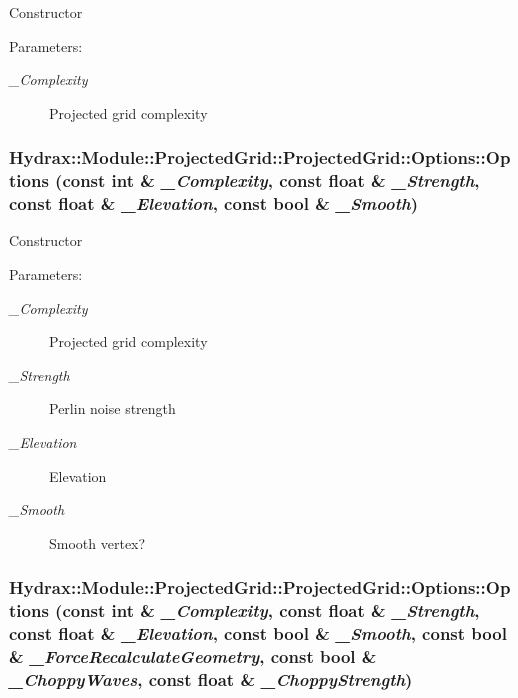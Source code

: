 Constructor \begin{Desc}
\item[Parameters:]
\begin{description}
\item[{\em \_\-Complexity}]Projected grid complexity \end{description}
\end{Desc}
\hypertarget{struct_hydrax_1_1_module_1_1_projected_grid_1_1_options_3c7e63596f51adb9435fcd88e9bde2b7}{
\subsubsection[{Options}]{\setlength{\rightskip}{0pt plus 5cm}Hydrax::Module::ProjectedGrid::ProjectedGrid::Options::Options (const int \& {\em \_\-Complexity}, \/  const float \& {\em \_\-Strength}, \/  const float \& {\em \_\-Elevation}, \/  const bool \& {\em \_\-Smooth})}}
\label{struct_hydrax_1_1_module_1_1_projected_grid_1_1_options_3c7e63596f51adb9435fcd88e9bde2b7}


Constructor \begin{Desc}
\item[Parameters:]
\begin{description}
\item[{\em \_\-Complexity}]Projected grid complexity \item[{\em \_\-Strength}]Perlin noise strength \item[{\em \_\-Elevation}]Elevation \item[{\em \_\-Smooth}]Smooth vertex? \end{description}
\end{Desc}
\hypertarget{struct_hydrax_1_1_module_1_1_projected_grid_1_1_options_bd3aaa3c56a7347a6c911e0c57b62be4}{
\subsubsection[{Options}]{\setlength{\rightskip}{0pt plus 5cm}Hydrax::Module::ProjectedGrid::ProjectedGrid::Options::Options (const int \& {\em \_\-Complexity}, \/  const float \& {\em \_\-Strength}, \/  const float \& {\em \_\-Elevation}, \/  const bool \& {\em \_\-Smooth}, \/  const bool \& {\em \_\-ForceRecalculateGeometry}, \/  const bool \& {\em \_\-ChoppyWaves}, \/  const float \& {\em \_\-ChoppyStrength})}}
\label{struct_hydrax_1_1_module_1_1_projected_grid_1_1_options_bd3aaa3c56a7347a6c911e0c57b62be4}


